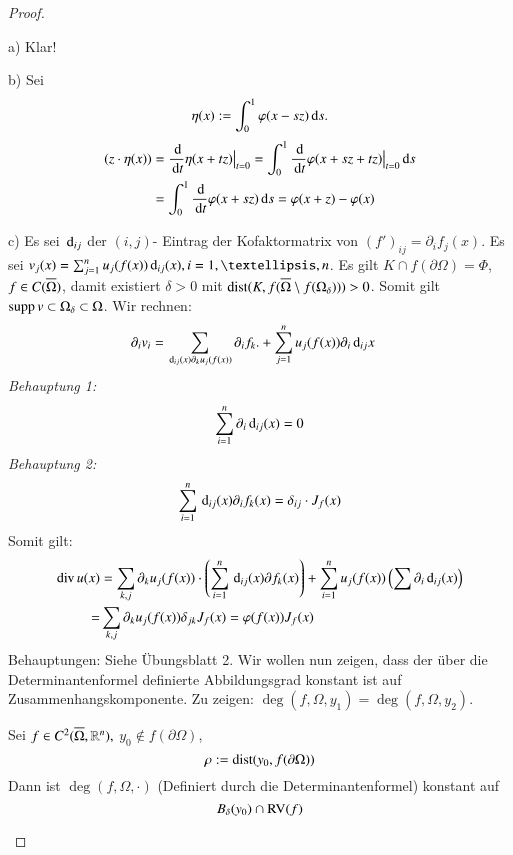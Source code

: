 \begin{proof}
    \begin{description}
    \item{a)}
    Klar!
    \item{b)}
    Sei
    \[
        \eta (x):= \int_0^1 \varphi (x-sz) \, \mathrm{d} s.
    \]
    \begin{align*}
        (z\cdot \eta(x))&=\frac{\, \mathrm{d}}{\, \mathrm{d} t } \eta (x+tz)\big|_{t=0}=\int_0^1 \frac{\, \mathrm{d}}{\, \mathrm{d} t} \varphi(x+sz+tz)
       \big|_{t=0} \, \mathrm{d} s\\
        &= \int_0^1 \frac{\, \mathrm{d}}{\, \mathrm{d} t} \varphi(x+sz)\, \mathrm{d} s=\varphi(x+z)-\varphi(x)
    \end{align*}
    \item{c)}
    Es sei $\, \mathrm{d} _{ij}$ der $(i,j)$- Eintrag der Kofaktormatrix von $(f')_{ij}= \partial _if_j(x)$.
    Es sei $v_j(x)=\sum_{j=1}^n u_j(f(x))\d _{ij}(x),i=1,…,n$. Es gilt $K\cap f(\partial \Omega) = \Phi$,
    $f\in C(\overline \Omega)$, damit existiert $\delta>0$ mit $\mathrm{dist}(K,f(\overline \Omega \setminus 
                f(\Omega_\delta)))>0$.
    Somit gilt $\mathrm{supp}\, v\subset \Omega_\delta\subset \Omega$.
    Wir rechnen:
    \begin{align*}
        \partial_iv_i&= \sum_{\, \mathrm{d} _{ij}(x)\partial_ku_j(f(x))}\partial _i f_k.+\sum_{j=1}^nu_j(f(x))
        \partial_i \, \mathrm{d}_{ij}x
    \end{align*}
    \textit{Behauptung 1:}
    \[
        \sum_{i=1}^n \partial_i\, \mathrm{d}_{ij}(x)=0
    \]
    \textit{Behauptung 2:}
    \[
        \sum_{i=1}^n \, \mathrm{d}_{ij} (x) \partial_if_k(x) =\delta_{ij}\cdot J_f(x)
    \]
    Somit gilt:
    \begin{align*}
        \mathrm{div}\, u(x)&=\sum_{k,j}\partial _k u_j(f(x))\cdot \left( \sum_{i=1}^n \, \mathrm{d}_{ij}(x) \partial f_k(x) 
                \right) +\sum_{i=1}^nu_j(f(x)) \left( \sum \partial _i \, \mathrm{d}_{ij}(x) \right)\\
        =&\sum_{k,j}\partial _k u_j(f(x))\delta _{jk} J_f(x)=\varphi(f(x))J_f(x)
    \end{align*}
    Behauptungen: Siehe Übungsblatt 2.
    Wir wollen nun zeigen, dass der über die Determinantenformel definierte Abbildungsgrad konstant
    ist auf Zusammenhangskomponente. Zu zeigen: $\deg(f,\Omega,y_1)=\deg(f,\Omega,y_2)$.

    \begin{lem}\label{2.8}
        Sei $f\in C^2(\overline \Omega,\mathbb{R}^n),$ $ y_0\nin f(\partial \Omega) $,
        \[
            \rho:=\mathrm{dist}(y_0,f(\partial \Omega))
        \]
        Dann ist $\deg(f,\Omega,\cdot)$ (Definiert durch die Determinantenformel) konstant auf
        \[
            B_\delta (y_0)\cap \mathrm{RV}(f)
        \]
    \end{lem}


\end{description}
\end{proof}
